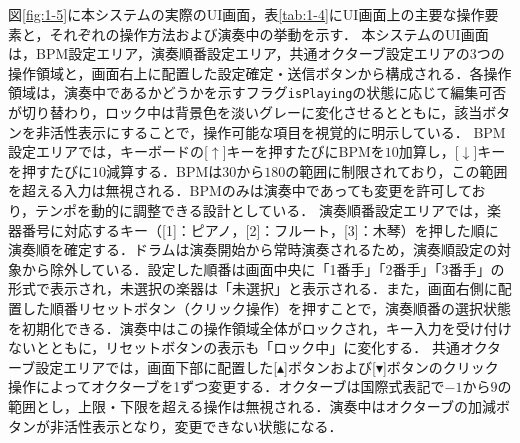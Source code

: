 \documentclass[uplatex,dvipdfmx]{jlreq}
\begin{document}
図\ref{fig:1-5}に本システムの実際のUI画面，表\ref{tab:1-4}にUI画面上の主要な操作要素と，それぞれの操作方法および演奏中の挙動を示す．
本システムのUI画面は，BPM設定エリア，演奏順番設定エリア，共通オクターブ設定エリアの3つの操作領域と，画面右上に配置した設定確定・送信ボタンから構成される．各操作領域は，演奏中であるかどうかを示すフラグ\texttt{isPlaying}の状態に応じて編集可否が切り替わり，ロック中は背景色を淡いグレーに変化させるとともに，該当ボタンを非活性表示にすることで，操作可能な項目を視覚的に明示している．
BPM設定エリアでは，キーボードの[$\uparrow$]キーを押すたびにBPMを$10$加算し，[$\downarrow$]キーを押すたびに$10$減算する．BPMは$30$から$180$の範囲に制限されており，この範囲を超える入力は無視される．BPMのみは演奏中であっても変更を許可しており，テンポを動的に調整できる設計としている．
演奏順番設定エリアでは，楽器番号に対応するキー（[1]：ピアノ，[2]：フルート，[3]：木琴）を押した順に演奏順を確定する．ドラムは演奏開始から常時演奏されるため，演奏順設定の対象から除外している．設定した順番は画面中央に「1番手」「2番手」「3番手」の形式で表示され，未選択の楽器は「未選択」と表示される．また，画面右側に配置した順番リセットボタン（クリック操作）を押すことで，演奏順番の選択状態を初期化できる．演奏中はこの操作領域全体がロックされ，キー入力を受け付けないとともに，リセットボタンの表示も「ロック中」に変化する．
共通オクターブ設定エリアでは，画面下部に配置した[$\blacktriangle$]ボタンおよび[$\blacktriangledown$]ボタンのクリック操作によってオクターブを1ずつ変更する．オクターブは国際式表記で$-1$から$9$の範囲とし，上限・下限を超える操作は無視される．演奏中はオクターブの加減ボタンが非活性表示となり，変更できない状態になる．
\end{document}

